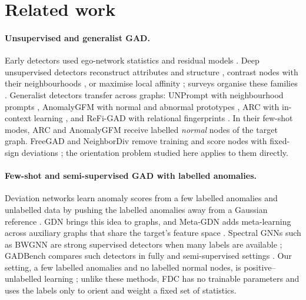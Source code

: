 \documentclass[pdflatex,sn-mathphys-ay]{sn-jnl}
\theoremstyle{plain}
\theoremstyle{remark}
\begin{document}
\section{Related work}\label{sec:related}

\paragraph{Unsupervised and generalist GAD.} Early detectors used ego-network statistics and residual models \citep{10.1007/978-3-642-13672-6_40,ijcai2017p299}. Deep unsupervised detectors reconstruct attributes and structure \citep{ding2019deep}, contrast nodes with their neighbourhoods \citep{liu2021cola,jin2021anemone,zheng2023slgad}, or maximise local affinity \citep{qiao2023truncated,zhang2025gctam}; surveys organise these families \citep{ma2023comprehensive,11048498}. Generalist detectors transfer across graphs: UNPrompt with neighbourhood prompts \citep{niu2025unprompt}, AnomalyGFM with normal and abnormal prototypes \citep{qiao2025anomalygfm}, ARC with in-context learning \citep{liu2024arc}, and ReFi-GAD with relational fingerprints \citep{liu2026refigad}. In their few-shot modes, ARC and AnomalyGFM receive labelled \emph{normal} nodes of the target graph. FreeGAD and NeighborDiv remove training and score nodes with fixed-sign deviations \citep{zhao2025freegad,wei2026neighbordiv}; the orientation problem studied here applies to them directly.

\paragraph{Few-shot and semi-supervised GAD with labelled anomalies.} Deviation networks learn anomaly scores from a few labelled anomalies and unlabelled data by pushing the labelled anomalies away from a Gaussian reference \citep{pang2019deep}. GDN brings this idea to graphs, and Meta-GDN adds meta-learning across auxiliary graphs that share the target's feature space \citep{ding2021few}. Spectral GNNs such as BWGNN are strong supervised detectors when many labels are available \citep{tang2022rethinking}; GADBench compares such detectors in fully and semi-supervised settings \citep{tang2023gadbench}. Our setting, a few labelled anomalies and no labelled normal nodes, is positive--unlabelled learning \citep{elkan2008learning,bekker2020learning}; unlike these methods, FDC has no trainable parameters and uses the labels only to orient and weight a fixed set of statistics.
\end{document}

